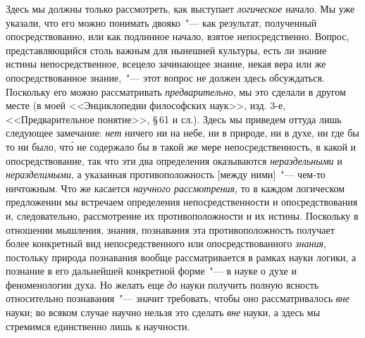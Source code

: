 
Здесь мы должны только рассмотреть, как выступает
\emph{логическое} начало. Мы уже указали, что его можно понимать
двояко~"--- как результат, полученный опосредствованно,
или как подлинное начало, взятое непосредственно.
Вопрос, представляющийся столь важным для
нынешней культуры, есть ли знание истины непосредственное,
всецело зачинающее знание, некая вера или
же опосредствованное знание,~"--- этот вопрос не должен
здесь обсуждаться. Поскольку его можно рассматривать
\emph{предварительно}, мы это сделали в другом месте (в моей
<<Энциклопедии философских наук>>, изд. 3-е, <<Предварительное
понятие>>, \S\,61 и сл.). Здесь мы приведем оттуда
лишь следующее замечание: \emph{нет} ничего ни на небе,
ни в природе, ни в духе, ни где бы то ни было, чт\'о не
содержало бы в такой же мере непосредственность, в какой
и опосредствование, так что эти два определения
оказываются \emph{нераздельными} и \emph{неразделимыми}, а указанная
противоположность [между ними]~"--- чем-то ничтожным.
Что же касается \emph{научного рассмотрения}, то в каждом
логическом предложении мы встречаем определения
непосредственности и опосредствования и, следовательно,
рассмотрение их противоположности и их истины. Поскольку
в отношении мышления, знания, познавания эта
противоположность получает более конкретный вид непосредственного
или опосредствованного \emph{знания}, постольку
природа познавания вообще рассматривается в рамках
науки логики, а познание в его дальнейшей конкретной
форме~"--- в науке о духе и феноменологии духа.
Но желать еще \emph{до} науки получить полную ясность относительно
познавания~"--- значит требовать, чтобы оно
рассматривалось \emph{вне} науки; во всяком случае научно
нельзя это сделать \emph{вне} науки, а здесь мы стремимся единственно
лишь к научности.

